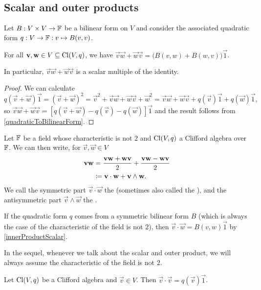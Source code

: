 \subsection{Scalar and outer products}
\begin{lemma} \label{innerProductScalar}
Let $B: V\times V\to \mathbb{F}$ be a bilinear form on $V$ and consider the associated quadratic form $q: V\to\mathbb{F} : v\mapsto B(v,v)$.

For all $\boldsymbol{\mathrm{v}},\boldsymbol{\mathrm{w}}\in V\subseteq \operatorname{Cl}(V,q)$, we have $\vec{v}\vec{w} + \vec{w}\vec{v} = \big(B(v,w)+B(w,v)\big)\vec{1}$.
\end{lemma}
In particular, $\vec{v}\vec{w} + \vec{w}\vec{v}$ is a scalar multiple of the identity.
\begin{proof}
We can calculate
\[ q(\vec{v}+\vec{w})\vec{1} = (\vec{v}+\vec{w})^2 = \vec{v}^2 + \vec{v}\vec{w} + \vec{w}\vec{v} + \vec{w}^2 = \vec{v}\vec{w} + \vec{w}\vec{v} + q(\vec{v})\vec{1} + q(\vec{w})\vec{1}, \]
so $\vec{v}\vec{w}+\vec{w}\vec{v} = [q(\vec{v}+\vec{w})-q(\vec{v})-q(\vec{w})]\vec{1}$ and the result follows from \ref{quadraticToBilinearForm}.
\end{proof}

\begin{definition}
Let $\mathbb{F}$ be a field whose characteristic is not $2$ and $\operatorname{Cl}(V,q)$ a Clifford algebra over $\mathbb{F}$. We can then write, for $\vec{v},\vec{w}\in V$
\begin{align*}
\boldsymbol{\mathrm{v}}\boldsymbol{\mathrm{w}} &= \frac{\boldsymbol{\mathrm{v}}\boldsymbol{\mathrm{w}}+\boldsymbol{\mathrm{w}}\boldsymbol{\mathrm{v}}}{2} + \frac{\boldsymbol{\mathrm{v}}\boldsymbol{\mathrm{w}}-\boldsymbol{\mathrm{w}}\boldsymbol{\mathrm{v}}}{2} \\
&\coloneqq \boldsymbol{\mathrm{v}}\cdot \boldsymbol{\mathrm{w}} + \boldsymbol{\mathrm{v}}\wedge \boldsymbol{\mathrm{w}}.
\end{align*}
We call the symmetric part $\vec{v}\cdot \vec{w}$ the  (sometimes also called the ),
and the antisymmetric part $\vec{v}\wedge \vec{w}$ the .
\end{definition}
If the quadratic form $q$ comes from a symmetric bilinear form $B$ (which is always the case of the characteristic of the field is not $2$), then $\vec{v}\cdot \vec{w} = B(v,w)\vec{1}$ by \ref{innerProductScalar}.

In the sequel, whenever we talk about the scalar and outer product, we will always assume the characteristic of the field is not $2$.

\begin{lemma}
Let $\operatorname{Cl}(V,q)$ be a Clifford algebra and $\vec{v}\in V$. Then $\vec{v}\cdot \vec{v} = q(\vec{v})\vec{1}$.
\end{lemma}

